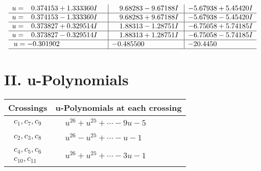 \documentclass[1p]{elsarticle_modified}
\theoremstyle{definition}
\begin{document}
$$\begin{array}{c|c|c}
\begin{aligned}
u &= \phantom{-}0.374153 + 1.333360 I\end{aligned}
 & \phantom{-}9.68283 - 9.67188 I & -5.67938 + 5.45420 I \\ \hline\begin{aligned}
u &= \phantom{-}0.374153 - 1.333360 I\end{aligned}
 & \phantom{-}9.68283 + 9.67188 I & -5.67938 - 5.45420 I \\ \hline\begin{aligned}
u &= \phantom{-}0.373827 + 0.329514 I\end{aligned}
 & \phantom{-}1.88313 - 1.28751 I & -6.75058 + 5.74185 I \\ \hline\begin{aligned}
u &= \phantom{-}0.373827 - 0.329514 I\end{aligned}
 & \phantom{-}1.88313 + 1.28751 I & -6.75058 - 5.74185 I \\ \hline\begin{aligned}
u &= -0.301902\phantom{ +0.000000I}\end{aligned}
 & -0.485500\phantom{ +0.000000I} & -20.4450\phantom{ +0.000000I}\\
 \hline 
 \end{array}$$\newpage
\newpage\renewcommand{\arraystretch}{1}
\centering \section*{ II. u-Polynomials}
\begin{tabular}{m{50pt}|m{274pt}}
Crossings & \hspace{64pt}u-Polynomials at each crossing \\
\hline $$\begin{aligned}c_{1},c_{7},c_{9}\end{aligned}$$&$\begin{aligned}
&u^{26}+u^{25}+\cdots-9 u-5
\end{aligned}$\\
\hline $$\begin{aligned}c_{2},c_{3},c_{8}\end{aligned}$$&$\begin{aligned}
&u^{26}- u^{25}+\cdots- u-1
\end{aligned}$\\
\hline $$\begin{aligned}c_{4},c_{5},c_{6}\\c_{10},c_{11}\end{aligned}$$&$\begin{aligned}
&u^{26}+u^{25}+\cdots-3 u-1
\end{aligned}$\\
\hline
\end{tabular}\newpage\renewcommand{\arraystretch}{1}
\end{document}
